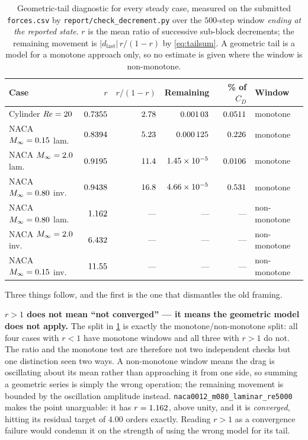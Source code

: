 \begin{table}[htbp]
  \centering
  \caption{Geometric-tail diagnostic for every steady case, measured on the submitted
  \texttt{forces.csv} by \texttt{report/check\_decrement.py} over the $500$-step window
  \emph{ending at the reported state}. $r$ is the mean ratio of successive sub-block
  decrements; the remaining movement is $|d_{\text{last}}|\,r/(1-r)$ by
  \cref{eq:tailsum}. A geometric tail is a model for a monotone approach only, so no
  estimate is given where the window is non-monotone.}
  \label{tab:ladder}
  \footnotesize
  \begin{tabular}{lrrrrl}
    \toprule
    Case & $r$ & $r/(1-r)$ & Remaining & \% of $C_D$ & Window \\
    \midrule
    Cylinder $\mathit{Re}=20$ & $\num{0.7355}$ & $\num{2.78}$
      & $\num{0.00103}$ & $\num{0.0511}$ & monotone \\
    NACA $M_\infty=0.15$ lam. & $\num{0.8394}$ & $\num{5.23}$
      & $\num{0.000125}$ & $\num{0.226}$ & monotone \\
    NACA $M_\infty=2.0$ lam. & $\num{0.9195}$ & $\num{11.4}$
      & $\num{1.45e-05}$ & $\num{0.0106}$ & monotone \\
    NACA $M_\infty=0.80$ inv. & $\num{0.9438}$ & $\num{16.8}$
      & $\num{4.66e-05}$ & $\num{0.531}$ & monotone \\
    \midrule
    NACA $M_\infty=0.80$ lam. & $\num{1.162}$ & --- & --- & ---
      & non-monotone \\
    NACA $M_\infty=2.0$ inv. & $\num{6.432}$ & --- & --- & ---
      & non-monotone \\
    NACA $M_\infty=0.15$ inv. & $\num{11.55}$ & --- & --- & ---
      & non-monotone \\
    \bottomrule
  \end{tabular}
\end{table}

Three things follow, and the first is the one that dismantles the old framing.

\textbf{$r>1$ does not mean ``not converged'' --- it means the geometric model does not
apply.} The split in \cref{tab:ladder} is exactly the monotone/non-monotone split: all four
cases with $r<1$ have monotone windows and all three with $r>1$ do not. The ratio and the
monotone test are therefore not two independent checks but one distinction seen two ways. A
non-monotone window means the drag is oscillating about its mean rather than approaching it
from one side, so summing a geometric series is simply the wrong operation; the remaining
movement is bounded by the oscillation amplitude instead. \texttt{naca0012\_m080\_laminar\_re5000}
makes the point unarguable: it has $r=\num{1.162}$, above unity, and it is
\emph{converged}, hitting its residual target of $4.00$ orders exactly. Reading $r>1$ as a
convergence failure would condemn it on the strength of using the wrong model for its tail.

